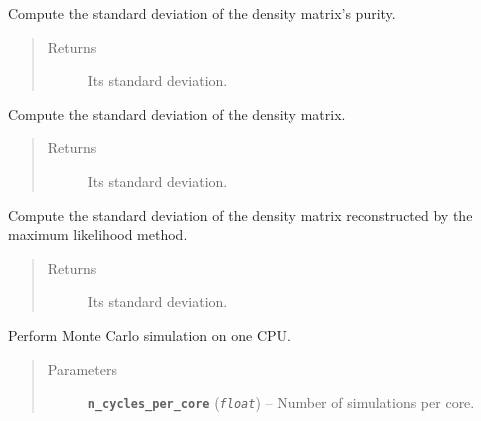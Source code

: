 \documentclass[letterpaper,10pt,english]{sphinxmanual}
\begin{document}
\begin{fulllineitems}
\begin{fulllineitems}
\label{modules:Tomography.Errorize.purity}
Compute the standard deviation of the density matrix's purity.
\begin{quote}\begin{description}
\item[{Returns}] \leavevmode
Its standard deviation.

\end{description}\end{quote}

\end{fulllineitems}


\begin{fulllineitems}
\label{modules:Tomography.Errorize.rho}
Compute the standard deviation of the density matrix.
\begin{quote}\begin{description}
\item[{Returns}] \leavevmode
Its standard deviation.

\end{description}\end{quote}

\end{fulllineitems}


\begin{fulllineitems}
\label{modules:Tomography.Errorize.rho_max_likelihood}
Compute the standard deviation of the density matrix reconstructed by the maximum likelihood method.
\begin{quote}\begin{description}
\item[{Returns}] \leavevmode
Its standard deviation.

\end{description}\end{quote}

\end{fulllineitems}


\begin{fulllineitems}
\label{modules:Tomography.Errorize.sim}
Perform Monte Carlo simulation on one CPU.
\begin{quote}\begin{description}
\item[{Parameters}] \leavevmode
\textbf{\texttt{n\_cycles\_per\_core}} (\emph{\texttt{float}}) -- Number of simulations per core.


\end{description}
\end{quote}
\end{fulllineitems}
\end{fulllineitems}
\end{document}
